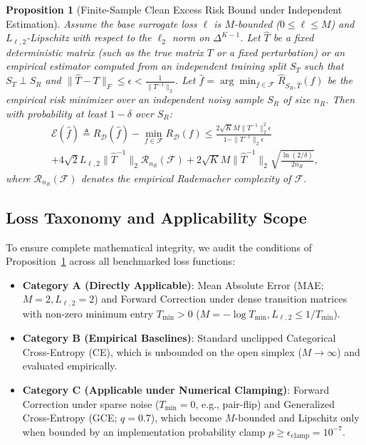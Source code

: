 \documentclass[journal]{IEEEtran}
\newtheorem{proposition}{Proposition}
\theoremstyle{definition}
\begin{document}
\begin{proposition}[Finite-Sample Clean Excess Risk Bound under Independent Estimation]
\label{prop:excess_risk}
Assume the base surrogate loss $\ell$ is $M$-bounded ($0 \le \ell \le M$) and $L_{\ell, 2}$-Lipschitz with respect to the $\ell_2$ norm on $\Delta^{K-1}$. Let $\hat{T}$ be a fixed deterministic matrix (such as the true matrix $T$ or a fixed perturbation) or an empirical estimator computed from an independent training split $S_T$ such that $S_T \perp S_R$ and $\|\hat{T} - T\|_F \le \epsilon < \frac{1}{\|T^{-1}\|_2}$. Let $\hat{f} = \arg\min_{f \in \mathcal{F}} \hat{R}_{S_R, \hat{T}}(f)$ be the empirical risk minimizer over an independent noisy sample $S_R$ of size $n_R$. Then with probability at least $1 - \delta$ over $S_R$:
\begin{multline}
\mathcal{E}(\hat{f}) \triangleq R_{\mathcal{D}}(\hat{f}) - \min_{f \in \mathcal{F}} R_{\mathcal{D}}(f) \le \frac{2 \sqrt{K} M \|T^{-1}\|_2^2 \epsilon}{1 - \|T^{-1}\|_2 \epsilon} \\
+ 4 \sqrt{2} L_{\ell, 2} \|\hat{T}^{-1}\|_2 \mathcal{R}_{n_R}(\mathcal{F}) + 2 \sqrt{K} M \|\hat{T}^{-1}\|_2 \sqrt{\frac{\ln(2/\delta)}{2n_R}},
\end{multline}
where $\mathcal{R}_{n_R}(\mathcal{F})$ denotes the empirical Rademacher complexity of $\mathcal{F}$.
\end{proposition}

\subsection{Loss Taxonomy and Applicability Scope}
To ensure complete mathematical integrity, we audit the conditions of Proposition~\ref{prop:excess_risk} across all benchmarked loss functions:
\begin{itemize}
    \item \textbf{Category A (Directly Applicable)}: Mean Absolute Error (MAE; $M=2, L_{\ell, 2}=2$) and Forward Correction under dense transition matrices with non-zero minimum entry $T_{\min} > 0$ ($M = -\log T_{\min}, L_{\ell, 2} \le 1/T_{\min}$).
    \item \textbf{Category B (Empirical Baselines)}: Standard unclipped Categorical Cross-Entropy (CE), which is unbounded on the open simplex ($M \to \infty$) and evaluated empirically.
    \item \textbf{Category C (Applicable under Numerical Clamping)}: Forward Correction under sparse noise ($T_{\min} = 0$, e.g., pair-flip) and Generalized Cross-Entropy (GCE; $q=0.7$), which become $M$-bounded and Lipschitz only when bounded by an implementation probability clamp $p \ge \epsilon_{\text{clamp}} = 10^{-7}$.
\end{itemize}
\end{document}

